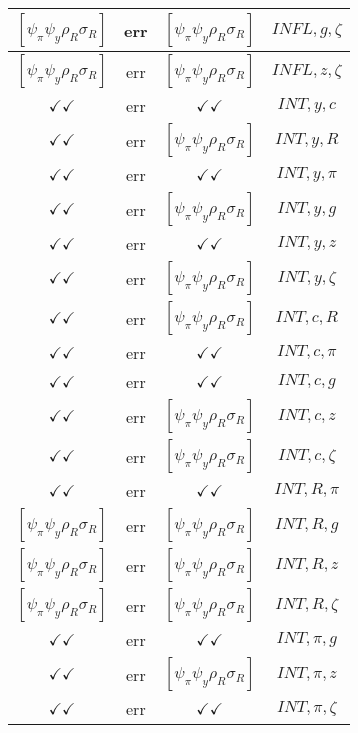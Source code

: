 \documentclass[a4paper,10pt]{article}
\begin{document}
\begin{longtable}{|c|c|c|c|}
\hline
$[\psi_\pi \psi_y \rho_R \sigma_R ]$ & err & $[\psi_\pi \psi_y \rho_R \sigma_R ]$ & ${INFL},{g},{\zeta}$ \\
\hline
$[\psi_\pi \psi_y \rho_R \sigma_R ]$ & err & $[\psi_\pi \psi_y \rho_R \sigma_R ]$ & ${INFL},{z},{\zeta}$ \\
\hline
$\checkmark\checkmark$ & err & $\checkmark\checkmark$ & ${INT},{y},{c}$ \\
\hline
$\checkmark\checkmark$ & err & $[\psi_\pi \psi_y \rho_R \sigma_R ]$ & ${INT},{y},{R}$ \\
\hline
$\checkmark\checkmark$ & err & $\checkmark\checkmark$ & ${INT},{y},{\pi}$ \\
\hline
$\checkmark\checkmark$ & err & $[\psi_\pi \psi_y \rho_R \sigma_R ]$ & ${INT},{y},{g}$ \\
\hline
$\checkmark\checkmark$ & err & $\checkmark\checkmark$ & ${INT},{y},{z}$ \\
\hline
$\checkmark\checkmark$ & err & $[\psi_\pi \psi_y \rho_R \sigma_R ]$ & ${INT},{y},{\zeta}$ \\
\hline
$\checkmark\checkmark$ & err & $[\psi_\pi \psi_y \rho_R \sigma_R ]$ & ${INT},{c},{R}$ \\
\hline
$\checkmark\checkmark$ & err & $\checkmark\checkmark$ & ${INT},{c},{\pi}$ \\
\hline
$\checkmark\checkmark$ & err & $\checkmark\checkmark$ & ${INT},{c},{g}$ \\
\hline
$\checkmark\checkmark$ & err & $[\psi_\pi \psi_y \rho_R \sigma_R ]$ & ${INT},{c},{z}$ \\
\hline
$\checkmark\checkmark$ & err & $[\psi_\pi \psi_y \rho_R \sigma_R ]$ & ${INT},{c},{\zeta}$ \\
\hline
$\checkmark\checkmark$ & err & $\checkmark\checkmark$ & ${INT},{R},{\pi}$ \\
\hline
$[\psi_\pi \psi_y \rho_R \sigma_R ]$ & err & $[\psi_\pi \psi_y \rho_R \sigma_R ]$ & ${INT},{R},{g}$ \\
\hline
$[\psi_\pi \psi_y \rho_R \sigma_R ]$ & err & $[\psi_\pi \psi_y \rho_R \sigma_R ]$ & ${INT},{R},{z}$ \\
\hline
$[\psi_\pi \psi_y \rho_R \sigma_R ]$ & err & $[\psi_\pi \psi_y \rho_R \sigma_R ]$ & ${INT},{R},{\zeta}$ \\
\hline
$\checkmark\checkmark$ & err & $\checkmark\checkmark$ & ${INT},{\pi},{g}$ \\
\hline
$\checkmark\checkmark$ & err & $[\psi_\pi \psi_y \rho_R \sigma_R ]$ & ${INT},{\pi},{z}$ \\
\hline
$\checkmark\checkmark$ & err & $\checkmark\checkmark$ & ${INT},{\pi},{\zeta}$ \\

\end{longtable}
\end{document}
